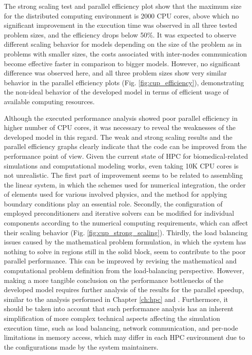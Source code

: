 The strong scaling test and parallel efficiency plot show that the maximum size for the distributed computing environment is \num{2000} \gls{CPU} cores, above which no significant improvement in the execution time was observed in all three tested problem sizes, and the efficiency drops below 50\%. It was expected to observe different scaling behavior for models depending on the size of the problem as in problems with smaller sizes, the costs associated with inter-nodes communication become effective faster in comparison to bigger models. However, no significant difference was observed here, and all three problem sizes show very similar behavior in the parallel efficiency plots (Fig. \ref{fig:cup_efficiency}), demonstrating the non-ideal behavior of the developed model in terms of efficient usage of available computing resources. 

Although the executed performance analysis showed poor parallel efficiency in higher number of \gls{CPU} cores, it was necessary to reveal the weaknesses of the developed model in this regard. The weak and strong scaling results and the parallel efficiency graphs clearly indicate that the code can be improved from the performance point of view. Given the current state of \gls{HPC} for biomedical-related simulations and computational modeling works,  even taking 10K \gls{CPU} cores is not unrealistic. The first part of improvement seems to be related to assembling the linear system, in which the schemes used for numerical integration, the order of elements used for various involved physics, and the method for applying boundary conditions play an essential role. Secondly, the configuration of employed preconditioners and iterative solvers can be modified for individual components according to the numerical computing requirements, which can affect their scaling behavior (Fig. \ref{fig:cup_strong_scaling}). Thirdly, the load balancing issues caused by the mathematical problem formulation, in which the system has nothing to solve in regions still in the solid block, seem to contribute to the poor parallel performance. This can be improved by revising the mathematical and computational problem definition from the load-balancing perspective. However, making a more tangible conclusion on the performance bottlenecks of the developed model requires further analysis of the results for the parallel speedup, similar to the analysis performed in Chapter \ref{ch:hpc} and \cite{Barzegari2022}. Furthermore, it should be taken into account that such performance analysis has an inherent simplification of more complex technical aspects affecting the simulation execution time, such as load balancing, network communication, and per-node limitations in memory access, which may differ in each \gls{HPC} environment due to the configurations made by the system maintainers.

